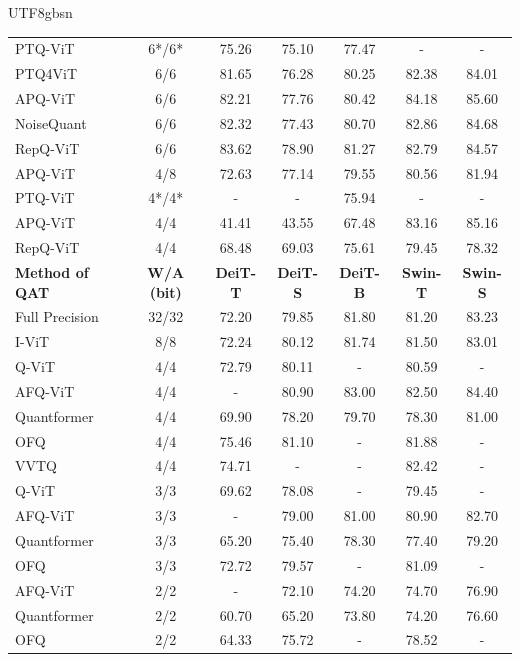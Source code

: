 \documentclass[10pt,journal,compsoc]{IEEEtran}
\newcommand{\<}{\left\langle}
\renewcommand{\>}{\right\rangle}
\newcommand{\1}{\mathbbm{1}}
\begin{document}
\begin{CJK}{UTF8}{gbsn}
\begin{table}[t]
{\begin{tabular}{l  c | c c c c c}
				\midrule
				PTQ-ViT~\cite{liu2021post} &6*/6*  & 75.26 & 75.10 & 77.47 & - & - \\
				PTQ4ViT~\cite{yuan2022ptq4vit} & 6/6  & 81.65 & 76.28 & 80.25 & 82.38 & 84.01 \\
				APQ-ViT~\cite{ding2022towards} & 6/6  & 82.21 & 77.76 & 80.42 & 84.18 & 85.60\\
				NoiseQuant~\cite{liu2023noisyquant} & 6/6  & 82.32 & 77.43 & 80.70 & 82.86 & 84.68\\
				RepQ-ViT\cite{li2023repq} & 6/6  & 83.62 & 78.90 & 81.27 & 82.79 & 84.57\\
				\midrule
				APQ-ViT~\cite{ding2022towards} & 4/8  & 72.63 & 77.14 & 79.55 & 80.56 & 81.94\\
				\midrule
				PTQ-ViT~\cite{liu2021post} & 4*/4*  & - & - & 75.94 & - & - \\
				APQ-ViT~\cite{ding2022towards} & 4/4 & 41.41 & 43.55 & 67.48 & 83.16 & 85.16 \\
				RepQ-ViT\cite{li2023repq} & 4/4  & 68.48 & 69.03 & 75.61 & 79.45 & 78.32\\
				\midrule
				\textbf{Method of QAT} & \textbf{W/A (bit)} & \textbf{DeiT-T} & \textbf{DeiT-S} & \textbf{DeiT-B} & \textbf{Swin-T} & \textbf{Swin-S} \\
				\midrule
				\midrule
				Full Precision & 32/32 & 72.20 & 79.85 & 81.80 & 81.20 & 83.23  \\
				\midrule
				I-ViT~\cite{li2023vit} & 8/8 & 72.24 & 80.12 & 81.74 & 81.50 & 83.01 \\
				\midrule
				Q-ViT~\cite{li2022q_diff} & 4/4 & 72.79 & 80.11 & - & 80.59 & - \\
				AFQ-ViT~\cite{li2022q_diff} & 4/4 & - & 80.90 & 83.00 & 82.50 & 84.40 \\
				Quantformer~\cite{wang2022quantformer} & 4/4 & 69.90 & 78.20 & 79.70 & 78.30 & 81.00 \\
				OFQ~\cite{liu2023oscillation} & 4/4 & 75.46 & 81.10 & - & 81.88 & - \\
				VVTQ~\cite{huang2023variation} & 4/4 & 74.71 & - & - & 82.42 & - \\
				\midrule
				Q-ViT~\cite{li2022q_diff} & 3/3 & 69.62 & 78.08 & - &  79.45 & - \\
				AFQ-ViT~\cite{li2022q_diff} & 3/3 & - & 79.00 & 81.00 & 80.90 & 82.70 \\
				Quantformer~\cite{wang2022quantformer} & 3/3 & 65.20 & 75.40 & 78.30 & 77.40 & 79.20 \\
				OFQ~\cite{liu2023oscillation} & 3/3 & 72.72 & 79.57 & - & 81.09 & - \\
				\midrule
				AFQ-ViT~\cite{li2022q_diff} & 2/2 & - & 72.10 & 74.20 & 74.70 & 76.90 \\
				Quantformer~\cite{wang2022quantformer} & 2/2 & 60.70 & 65.20 & 73.80 & 74.20 & 76.60 \\
				OFQ~\cite{liu2023oscillation} & 2/2 & 64.33 & 75.72 & - & 78.52 & - \\
				\bottomrule[0.1em]
		\end{tabular}}
		\vspace{-2mm}
	\end{table}


\end{CJK}
\end{document}
